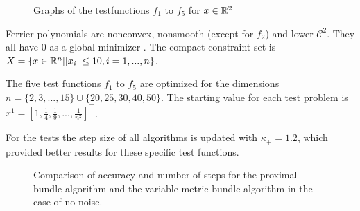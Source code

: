 \begin{figure}[ht]%
	\begin{subfigure}[t]{0.32\textwidth}
	\end{subfigure}
	\begin{subfigure}[t]{0.32\textwidth}
	\end{subfigure}
	\begin{subfigure}[t]{0.32\textwidth}
	\end{subfigure}
	\newline
	\begin{subfigure}{0.47\textwidth}
		\begin{flushright}
		\end{flushright}
		\vfil
	\end{subfigure}
	\begin{subfigure}{0.49\textwidth}
	\end{subfigure}
	\caption{Graphs of the testfunctions $f_1$ to $f_5$ for $x\in\mathbb{R}^2$}
	\label{fig_ferr_pol}
\end{figure}
Ferrier polynomials are nonconvex, nonsmooth (except for \(f_2\)) and lower-\(\mathcal{C}^2\). They all have \(0\) as a global minimizer \cite{Hare2010}. The compact constraint set is \(X=\{x \in \mathbb{R}^n|\lvert x_i\rvert \leq 10, i = 1,...,n \}\).

The five test functions \(f_1\) to \(f_5\) are optimized for the dimensions \(n=\{2,3,...,15\} \cup \{20,25,30,40,50\}\).
The starting value for each test problem is \(x^1=[1,\frac{1}{4},\frac{1}{9},...,\frac{1}{n^2}]^{\top}\).

For the tests the step size of all algorithms is updated with \(\kappa_+ = 1.2\), which provided better results for these specific test functions.


\begin{figure}[ht]%
	\begin{subfigure}{0.49\textwidth}
	\end{subfigure}
	\begin{subfigure}{0.49\textwidth}
	\end{subfigure}
	\caption{Comparison of accuracy and number of steps for the proximal bundle algorithm and the variable metric bundle algorithm in the case of no noise.}
	\label{fig_no_noise}
\end{figure}

